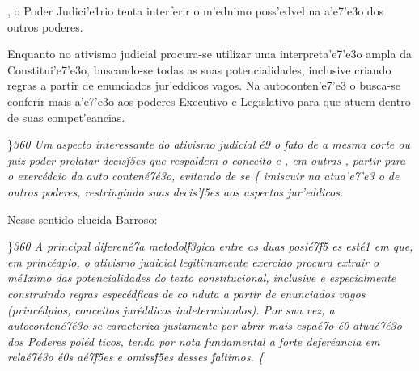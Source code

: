  \ltrch{}  , o Poder Judici'e1rio
tenta interferir o m'ednimo poss'edvel na a'e7'e3o dos outros poderes.
\par \tab Enquanto no ativismo judicial procura-se utilizar uma
interpreta'e7'e3o ampla da Constitui'e7'e3o, buscando-se todas as suas
potencialidades, inclusive criando regras a partir de enunciados
jur'eddicos vagos. Na autoconten'e7'e3 o busca-se conferir mais a'e7'e3o
aos poderes Executivo e Legislativo para que atuem dentro de suas
compet'eancias.
\par \}\pard \ltrpar\qj {}\sl360\widctlpar\wrapdefault\faauto{} {\rtlch{}  \ltrch{}  Um aspecto interessante do ativismo judicial \'e9 o fato de a mesma corte}{
\rtlch{}  \ltrch{}   ou juiz}{\rtlch{}  \ltrch{}   poder prolatar decis\'f5es que respaldem o conceito e}{\rtlch{}  \ltrch{}  ,}{\rtlch{}  \ltrch{} 
  em outras}{\rtlch{}  \ltrch{}  ,}{\rtlch{}  \ltrch{}   }{\rtlch{}  \ltrch{}  partir para o exerc\'edcio da auto}{\rtlch{} 
 \ltrch{}  conten\'e7\'e3o, }{\rtlch{}  \ltrch{}  evitando de se }\{\rtlch{}
 \ltrch{}  imiscuir na atua'e7'e3
o de outros poderes, restringindo suas decis'f5es aos aspectos
jur'eddicos. \par Nesse sentido elucida Barroso:
\par \}\pard \ltrpar\qj {}\sl360\widctlpar\wrapdefault\faauto{} {\rtlch{}  \ltrch{}  A principal diferen\'e7a metodol\'f3gica entre as duas posi\'e7\'f5
es est\'e1 em que, em princ\'edpio, o ativismo judicial legitimamente exercido procura extrair o m\'e1ximo das potencialidades do texto constitucional, inclusive e especialmente construindo regras espec\'edficas de co
nduta a partir de enunciados vagos (princ\'edpios, conceitos jur\'eddicos indeterminados). Por sua vez, a autoconten\'e7\'e3o se caracteriza justamente por abrir mais espa\'e7o \'e0 atua\'e7\'e3o dos Poderes pol\'ed
ticos, tendo por nota fundamental a forte defer\'eancia em rela\'e7\'e3o \'e0s a\'e7\'f5es e omiss\'f5es desses \'faltimos.}{\rtlch{}  \ltrch{} \super{} }\{\rtlch{}

